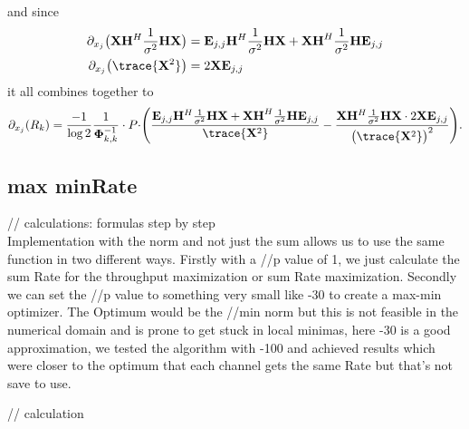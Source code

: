 and since
\begin{align}
	\partial_{x_j}\bigr(\mathbf{X}\mathbf{H}^H\frac{1}{\sigma^2}\mathbf{H}\mathbf{X}\bigl) &= \mathbf{E}_{j,j}\mathbf{H}^H\frac{1}{\sigma^2}\mathbf{HX} + \mathbf{XH}^H\frac{1}{\sigma^2}\mathbf{HE}_{j,j}\\
	\partial_{x_j}\bigr(\trace{\mathbf{X}^2}\bigl) &= 2\mathbf{XE}_{j,j}
\end{align}
it all combines together to
\begin{equation}
	\partial_{x_j}(R_k) = \frac{-1}{\log{2}}\frac{1}{\mathbf{\Phi}_{k,k}^{-1}} \cdot P \cdot \Biggr(\frac{\mathbf{E}_{j,j}\mathbf{H}^H\frac{1}{\sigma^2}\mathbf{HX} + \mathbf{XH}^H\frac{1}{\sigma^2}\mathbf{HE}_{j,j}}{\trace{\mathbf{X}^2}} - \frac{\mathbf{X}\mathbf{H}^H\frac{1}{\sigma^2}\mathbf{H}\mathbf{X} \cdot 2\mathbf{XE}_{j,j}}{\bigr(\trace{\mathbf{X}^2}\bigl)^2}\Biggl).
\end{equation}

\subsection{max minRate}
// calculations: formulas step by step\\
Implementation with the norm and not just the sum allows us to use the same function in two different ways. Firstly with a //p value of 1, we just calculate the sum Rate for the throughput maximization or sum Rate maximization. Secondly we can set the //p value to something very small like -30 to create a max-min optimizer. The Optimum would be the //min norm but this is not feasible in the numerical domain and is prone to get stuck in local minimas, here -30 is a good approximation, we tested the algorithm with -100 and achieved results which were closer to the optimum that each channel gets the same Rate but that's not save to use.


// calculation
